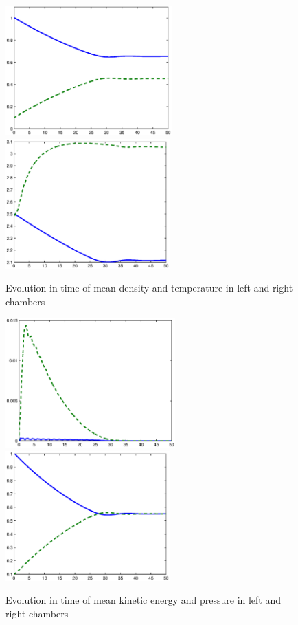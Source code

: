\begin{figure}[bhpt]
\centerline{
\includegraphics[height=5.0cm]
{chapters/hoffman-3/eps/Rho_2.eps}
\includegraphics[height=5.0cm]
{chapters/hoffman-3/eps/T_2.eps}
}
\caption{Evolution in time of mean density and temperature in left and right
chambers}
\label{densitytemp}
\end{figure}
\begin{figure}[bhpt]
\centerline{
\includegraphics[height=5.0cm]
{chapters/hoffman-3/eps/K_2.eps}
\includegraphics[height=5.0cm]
{chapters/hoffman-3/eps/P_2.eps}
}
\caption{Evolution in time of mean kinetic energy and pressure in left and right
chambers}
\label{kinenergypress}
\end{figure}


